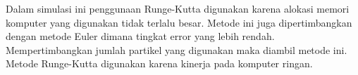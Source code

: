 Dalam simulasi ini penggunaan Runge-Kutta digunakan karena alokasi memori komputer yang digunakan tidak terlalu besar. Metode ini juga dipertimbangkan dengan metode Euler dimana tingkat error yang lebih rendah. Mempertimbangkan jumlah partikel yang digunakan maka diambil metode ini. Metode Runge-Kutta digunakan karena kinerja pada komputer ringan.



%
%